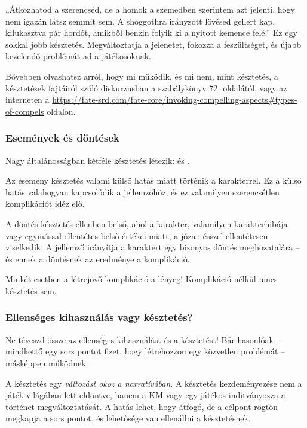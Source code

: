 „Átkozhatod a szerencséd, de a homok a szemedben szerintem azt jelenti, hogy nem igazán látsz semmit sem. A shoggothra irányzott lövésed gellert kap, kilukasztva pár hordót, amikből benzin folyik ki a nyitott kemence felé.” Ez egy sokkal jobb késztetés. Megváltoztatja a jelenetet, fokozza a feszültséget, és újabb kezelendő problémát ad a játékosoknak.

Bővebben olvashatsz arról, hogy mi működik, és mi nem, mint késztetés, a késztetések fajtáiról szóló diskurzusban a  szabálykönyv 72. oldalától, vagy az interneten a \url{https://fate-srd.com/fate-core/invoking-compelling-aspects#types-of-compels} oldalon.

\newpage

\subsubsection{Események és döntések}

Nagy általánosságban kétféle késztetés létezik:  és .

Az esemény késztetés valami külső hatás miatt történik a karakterrel. Ez a külső hatás valahogyan kapcsolódik a jellemzőhöz, és ez valamilyen szerencsétlen komplikációt idéz elő.

A döntés késztetés ellenben belső, ahol a karakter, valamilyen karakterhibája vagy egymással ellentétes belső értékei miatt, a józan ésszel ellentétesen viselkedik. A jellemző irányítja a karaktert egy bizonyos döntés meghozatalára – és ennek a döntésnek az eredménye a komplikáció.

Minkét esetben a létrejövő komplikáció a lényeg! Komplikáció nélkül nincs késztetés sem.

\subsubsection{Ellenséges kihasználás vagy késztetés?}

Ne téveszd össze az ellenséges kihasználást és a késztetést! Bár hasonlóak – mindkettő egy sors pontot fizet, hogy létrehozzon egy közvetlen problémát – másképpen működnek.

A késztetés egy \emph{változást okoz a narratívában}. A késztetés kezdeményezése nem a játék világában lett eldöntve, hanem a KM vagy egy játékos indítványozza a történet megváltoztatását. A hatás lehet, hogy átfogó, de a célpont rögtön megkapja a sors pontot, és lehetősége van ellenállni a késztetésnek.


